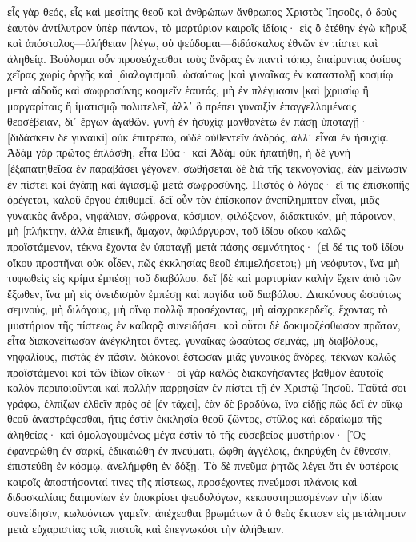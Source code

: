 εἷς γὰρ θεός, εἷς καὶ μεσίτης θεοῦ καὶ ἀνθρώπων ἄνθρωπος Χριστὸς Ἰησοῦς, 
ὁ δοὺς ἑαυτὸν ἀντίλυτρον ὑπὲρ πάντων, τὸ μαρτύριον καιροῖς ἰδίοις· 
εἰς ὃ ἐτέθην ἐγὼ κῆρυξ καὶ ἀπόστολος—ἀλήθειαν [λέγω, οὐ ψεύδομαι—διδάσκαλος ἐθνῶν ἐν πίστει καὶ ἀληθείᾳ. 
Βούλομαι οὖν προσεύχεσθαι τοὺς ἄνδρας ἐν παντὶ τόπῳ, ἐπαίροντας ὁσίους χεῖρας χωρὶς ὀργῆς καὶ [διαλογισμοῦ. 
ὡσαύτως [καὶ γυναῖκας ἐν καταστολῇ κοσμίῳ μετὰ αἰδοῦς καὶ σωφροσύνης κοσμεῖν ἑαυτάς, μὴ ἐν πλέγμασιν [καὶ [χρυσίῳ ἢ μαργαρίταις ἢ ἱματισμῷ πολυτελεῖ, 
ἀλλ᾽ ὃ πρέπει γυναιξὶν ἐπαγγελλομέναις θεοσέβειαν, δι᾽ ἔργων ἀγαθῶν. 
γυνὴ ἐν ἡσυχίᾳ μανθανέτω ἐν πάσῃ ὑποταγῇ· 
[διδάσκειν δὲ γυναικὶ] οὐκ ἐπιτρέπω, οὐδὲ αὐθεντεῖν ἀνδρός, ἀλλ᾽ εἶναι ἐν ἡσυχίᾳ. 
Ἀδὰμ γὰρ πρῶτος ἐπλάσθη, εἶτα Εὕα· 
καὶ Ἀδὰμ οὐκ ἠπατήθη, ἡ δὲ γυνὴ [ἐξαπατηθεῖσα ἐν παραβάσει γέγονεν. 
σωθήσεται δὲ διὰ τῆς τεκνογονίας, ἐὰν μείνωσιν ἐν πίστει καὶ ἀγάπῃ καὶ ἁγιασμῷ μετὰ σωφροσύνης. 
Πιστὸς ὁ λόγος· εἴ τις ἐπισκοπῆς ὀρέγεται, καλοῦ ἔργου ἐπιθυμεῖ. 
δεῖ οὖν τὸν ἐπίσκοπον ἀνεπίλημπτον εἶναι, μιᾶς γυναικὸς ἄνδρα, νηφάλιον, σώφρονα, κόσμιον, φιλόξενον, διδακτικόν, 
μὴ πάροινον, μὴ [πλήκτην, ἀλλὰ ἐπιεικῆ, ἄμαχον, ἀφιλάργυρον, 
τοῦ ἰδίου οἴκου καλῶς προϊστάμενον, τέκνα ἔχοντα ἐν ὑποταγῇ μετὰ πάσης σεμνότητος· 
(εἰ δέ τις τοῦ ἰδίου οἴκου προστῆναι οὐκ οἶδεν, πῶς ἐκκλησίας θεοῦ ἐπιμελήσεται;) 
μὴ νεόφυτον, ἵνα μὴ τυφωθεὶς εἰς κρίμα ἐμπέσῃ τοῦ διαβόλου. 
δεῖ [δὲ καὶ μαρτυρίαν καλὴν ἔχειν ἀπὸ τῶν ἔξωθεν, ἵνα μὴ εἰς ὀνειδισμὸν ἐμπέσῃ καὶ παγίδα τοῦ διαβόλου. 
Διακόνους ὡσαύτως σεμνούς, μὴ διλόγους, μὴ οἴνῳ πολλῷ προσέχοντας, μὴ αἰσχροκερδεῖς, 
ἔχοντας τὸ μυστήριον τῆς πίστεως ἐν καθαρᾷ συνειδήσει. 
καὶ οὗτοι δὲ δοκιμαζέσθωσαν πρῶτον, εἶτα διακονείτωσαν ἀνέγκλητοι ὄντες. 
γυναῖκας ὡσαύτως σεμνάς, μὴ διαβόλους, νηφαλίους, πιστὰς ἐν πᾶσιν. 
διάκονοι ἔστωσαν μιᾶς γυναικὸς ἄνδρες, τέκνων καλῶς προϊστάμενοι καὶ τῶν ἰδίων οἴκων· 
οἱ γὰρ καλῶς διακονήσαντες βαθμὸν ἑαυτοῖς καλὸν περιποιοῦνται καὶ πολλὴν παρρησίαν ἐν πίστει τῇ ἐν Χριστῷ Ἰησοῦ. 
Ταῦτά σοι γράφω, ἐλπίζων ἐλθεῖν πρὸς σὲ [ἐν τάχει], 
ἐὰν δὲ βραδύνω, ἵνα εἰδῇς πῶς δεῖ ἐν οἴκῳ θεοῦ ἀναστρέφεσθαι, ἥτις ἐστὶν ἐκκλησία θεοῦ ζῶντος, στῦλος καὶ ἑδραίωμα τῆς ἀληθείας· 
καὶ ὁμολογουμένως μέγα ἐστὶν τὸ τῆς εὐσεβείας μυστήριον· [Ὃς ἐφανερώθη ἐν σαρκί, ἐδικαιώθη ἐν πνεύματι, ὤφθη ἀγγέλοις, ἐκηρύχθη ἐν ἔθνεσιν, ἐπιστεύθη ἐν κόσμῳ, ἀνελήμφθη ἐν δόξῃ. 
Τὸ δὲ πνεῦμα ῥητῶς λέγει ὅτι ἐν ὑστέροις καιροῖς ἀποστήσονταί τινες τῆς πίστεως, προσέχοντες πνεύμασι πλάνοις καὶ διδασκαλίαις δαιμονίων 
ἐν ὑποκρίσει ψευδολόγων, κεκαυστηριασμένων τὴν ἰδίαν συνείδησιν, 
κωλυόντων γαμεῖν, ἀπέχεσθαι βρωμάτων ἃ ὁ θεὸς ἔκτισεν εἰς μετάλημψιν μετὰ εὐχαριστίας τοῖς πιστοῖς καὶ ἐπεγνωκόσι τὴν ἀλήθειαν. 
